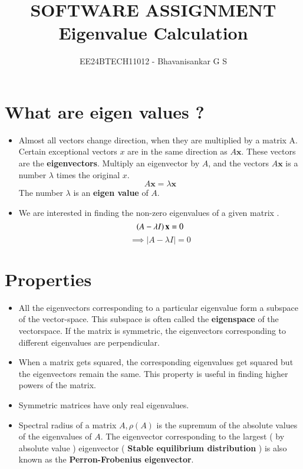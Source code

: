 \documentclass[report,12pt,onecolumn]{IEEEtran}
\theoremstyle{remark}
\begin{document}

\vspace{3cm}

\title{\Large SOFTWARE ASSIGNMENT \\ Eigenvalue Calculation}
\author{EE24BTECH11012 - Bhavanisankar G S}
\maketitle

\renewcommand{\thefigure}{\theenumi}
\renewcommand{\thetable}{\theenumi}

\section{\Large What are eigen values ?}
\begin{itemize}
	\item Almost all vectors change direction, when they are multiplied by a matrix A. Certain exceptional vectors \textbf{$x$} are in the same direction as $A \textbf{x}$. These vectors are the \textbf{eigenvectors}. Multiply an eigenvector by $A$, and the vectors $A \textbf{x}$ is a number $\lambda$ times the original \textbf{$x$}.
		$$ \boxed{ A \textbf{x} = \lambda \textbf{x} } $$
The number $\lambda$ is an \textbf{eigen value} of $A$.
	\item We are interested in finding the non-zero eigenvalues of a given matrix .
		$$ \left(A - \lambda I\right) \textbf{x} = 0 $$
		$$ \implies \boxed{| A - \lambda I | = 0} $$
\end{itemize}
\section{\Large Properties}
\begin{itemize}
	\item All the eigenvectors corresponding to a particular eigenvalue form a subspace of the vector-space. This subspace is often called the \textbf{eigenspace} of the vectorspace. If the matrix is symmetric, the eigenvectors corresponding to different eigenvalues are perpendicular.
	\item When a matrix gets squared, the corresponding eigenvalues get squared but the eigenvectors remain the same. This property is useful in finding higher powers of the matrix.
	\item Symmetric matrices have only real eigenvalues.
	\item Spectral radius of a matrix $A, \rho(A) $ is the supremum of the absolute values of the eigenvalues of $A$. The eigenvector corresponding to the largest ( by absolute value ) eigenvector (\textbf{ Stable equilibrium distribution }) is also known as the \textbf{Perron-Frobenius eigenvector}.
\end{itemize}
\end{document}
